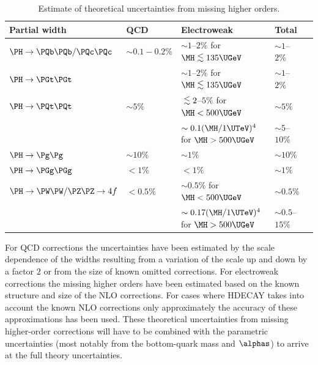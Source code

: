 \begin{table}[ht]
   \caption{Estimate of theoretical uncertainties from missing higher orders.}
   \begin{center}
   \small  
   \begin{tabular}{lllll}
   \hline
   \textbf{Partial width} & \textbf{QCD} & \textbf{Electroweak} & \textbf{Total} \\
\hline
 $\PH \to \PQb\PQb/\PQc\PQc$ &    $\sim 0.1{-}0.2\%$
  &     $\sim 1$--$2\%$ for $\MH \lsim 135\UGeV$     &      $\sim1$--$2 \%$ \\
\hline
$\PH\to \PGt \PGt$ & & $\sim1$--$2\%$  for $\MH \lsim 135\UGeV$ &       $\sim1$--$2 \%$ \\
\hline
$\PH \to \PQt\PQt$ & $\sim 5\%$&
      ${\lsim  2}$--${5\%}$   for $\MH < 500\UGeV$     &       $\sim5\%$ \\
& &      $\sim 0.1 ({\MH}/{1\UTeV})^4$ for $\MH > 500\UGeV$  &       $\sim5$--$10\%$ \\
\hline
$\PH \to \Pg\Pg$ & ${\sim 10\%}$   &
$\sim 1\%$   &   $\sim10\%$\\
\hline
$\PH \to \PGg \PGg$  & ${<1\%}$ & $<1\%$    &  $\sim1\%$ \\
\hline
$\PH \to \PW\PW/\PZ\PZ\to4f$ & $<0.5\%$ &   $\sim 0.5\%$ for $\MH < 500\UGeV$ &  $\sim0.5\%$\\
$\phantom{\PH\to    \to 4f}$             && $\sim 0.17 ({\MH}/{1\UTeV})^4$ for $\MH > 500\UGeV$
&        $\sim0.5$--$15\%$                          \\
\hline
\end{tabular}
\end{center}
\label{tab:uncertainty}
\end{table}
For QCD corrections the uncertainties have been estimated by
the scale dependence of the widths resulting from a  variation of the scale
up and down by a factor $2$ or from the size of known omitted
corrections. For electroweak corrections the missing higher orders
have been estimated based on the known structure and size of the NLO
corrections. For cases where HDECAY takes into account the known NLO
corrections only approximately the accuracy of these approximations
has been used.
These theoretical uncertainties from missing higher-order corrections will
have to be combined with the parametric uncertainties (most notably from the
bottom-quark mass and $\alphas$) to arrive at the full theory uncertainties.

